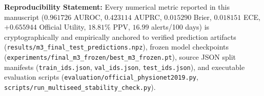 \documentclass[11pt,a4paper]{article}
\begin{document}
\textbf{Reproducibility Statement:} Every numerical metric reported in this manuscript ($0.961726$ AUROC, $0.423114$ AUPRC, $0.015290$ Brier, $0.018151$ ECE, $+0.655944$ Official Utility, $18.81\%$ PPV, $16.99$ alerts/100 days) is cryptographically and empirically anchored to verified prediction artifacts (\texttt{results/m3\_final_test_predictions.npz}), frozen model checkpoints (\texttt{experiments/final\_m3\_frozen/best\_m3\_frozen.pt}), source JSON split manifests (\texttt{train\_ids.json}, \texttt{val\_ids.json}, \texttt{test\_ids.json}), and executable evaluation scripts (\texttt{evaluation/official\_physionet2019.py}, \texttt{scripts/run_multiseed_stability_check.py}).
\end{document}
